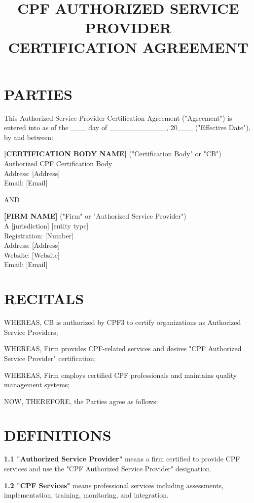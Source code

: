 \documentclass[11pt,a4paper]{article}
\title{\textbf{CPF AUTHORIZED SERVICE PROVIDER\\CERTIFICATION AGREEMENT}}
\author{}
\date{}
\begin{document}
\maketitle

\section*{PARTIES}

This Authorized Service Provider Certification Agreement ("Agreement") is entered into as of the \_\_\_ day of \_\_\_\_\_\_\_\_\_\_\_, 20\_\_\_ ("Effective Date"), by and between:

\textbf{[CERTIFICATION BODY NAME]} ("Certification Body" or "CB")\\
Authorized CPF Certification Body\\
Address: [Address]\\
Email: [Email]

AND

\textbf{[FIRM NAME]} ("Firm" or "Authorized Service Provider")\\
A [jurisdiction] [entity type]\\
Registration: [Number]\\
Address: [Address]\\
Website: [Website]\\
Email: [Email]

\section*{RECITALS}

WHEREAS, CB is authorized by CPF3 to certify organizations as Authorized Service Providers;

WHEREAS, Firm provides CPF-related services and desires "CPF Authorized Service Provider" certification;

WHEREAS, Firm employs certified CPF professionals and maintains quality management systems;

NOW, THEREFORE, the Parties agree as follows:

\section{DEFINITIONS}

\textbf{1.1 "Authorized Service Provider"} means a firm certified to provide CPF services and use the "CPF Authorized Service Provider" designation.

\textbf{1.2 "CPF Services"} means professional services including assessments, implementation, training, monitoring, and integration.
\end{document}
